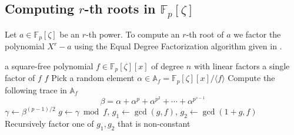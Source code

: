 \documentclass[12pt]{article}
\theoremstyle{plain}
\theoremstyle{definition}
\def\F{\mathbb{F}}
\newcounter{algorithm}
\begin{document}

\subsection{Computing $r$-th roots in $\F_p[\zeta]$}
\label{subsection:rth-root-fpz}

Let $a \in \F_p[\zeta]$ be an $r$-th power. To compute an $r$-th root of $a$ we factor the polynomial $X^r - a$ using the Equal Degree Factorization algorithm given in \cite{kaltofen1997fast}.

\begin{algorithm}
\label{algorithm:edf}
	\begin{algorithmic}[1]
		\REQUIRE a square-free polynomial $f \in \F_p[\zeta][x]$ of degree $n$ with linear factors
		\ENSURE a single factor of $f$
			\RETURN $f$
		\ENDIF
		\STATE Pick a random element $\alpha \in \mathbb{A}_f = \F_p[\zeta][x]/\langle f \rangle$
		\STATE\label{step:edf-trace} Compute the following trace in $\mathbb{A}_f$
			\[ \beta = \alpha + \alpha^p + \alpha^{p^2} + \cdots + \alpha^{p^{s - 1}} \]
		\STATE $\gamma \leftarrow \beta^{(p - 1) / 2}$
		\STATE $g \leftarrow \gamma \bmod f$, $g_1 \leftarrow \gcd(g, f)$, $g_2 \leftarrow \gcd(1 + g, f)$
		\STATE Recursively factor one of $g_1, g_2$ that is non-constant
	\end{algorithmic}
\end{algorithm}
\end{document}
